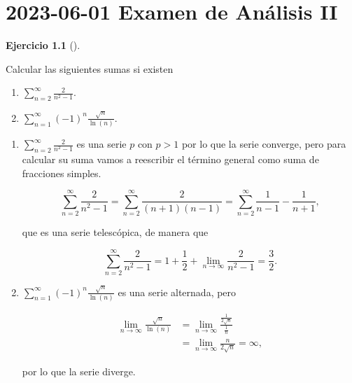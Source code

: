 \documentclass[
  spanish,
  a4paper,
]{scrreport}
\theoremstyle{definition}
\newtheorem{exercise}{Ejercicio}[chapter]
\theoremstyle{remark}
\begin{document}

\chapter{\texorpdfstring{2023-06-01 Examen de Análisis
II}{2023-06-01  Examen de Análisis II}}\label{examen-de-anuxe1lisis-ii-1}

\begin{exercise}[]\protect\hypertarget{exr-1}{}\label{exr-1}

Calcular las siguientes sumas si existen

\begin{enumerate}
\def\labelenumi{\alph{enumi}.}
\item
  \(\displaystyle \sum_{n=2}^\infty \frac{2}{n^2-1}\).
\item
  \(\displaystyle\sum_{n=1}^\infty (-1)^n \frac{\sqrt{n}}{\ln(n)}\).
\end{enumerate}

\end{exercise}

\begin{tcolorbox}[enhanced jigsaw, arc=.35mm, bottomrule=.15mm, bottomtitle=1mm, breakable, colback=white, colbacktitle=quarto-callout-tip-color!10!white, colframe=quarto-callout-tip-color-frame, coltitle=black, left=2mm, leftrule=.75mm, opacityback=0, opacitybacktitle=0.6, rightrule=.15mm, title=\textcolor{quarto-callout-tip-color}{\faLightbulb}\hspace{0.5em}{Solución}, titlerule=0mm, toprule=.15mm, toptitle=1mm]

\begin{enumerate}
\def\labelenumi{\alph{enumi}.}
\item
  \(\displaystyle \sum_{n=2}^\infty \frac{2}{n^2-1}\) es una serie \(p\)
  con \(p>1\) por lo que la serie converge, pero para calcular su suma
  vamos a reescribir el término general como suma de fracciones simples.

  \[
  \sum_{n=2}^\infty \frac{2}{n^2-1} 
  = \sum_{n=2}^\infty \frac{2}{(n+1)(n-1)} 
  = \sum_{n=2}^\infty \frac{1}{n-1}-\frac{1}{n+1},
  \]

  que es una serie telescópica, de manera que

  \[
  \sum_{n=2}^\infty \frac{2}{n^2-1} = 1 +\frac{1}{2}+ \lim_{n\to\infty}\frac{2}{n^2-1} = \frac{3}{2}.
  \]
\item
  \(\displaystyle\sum_{n=1}^\infty (-1)^n \frac{\sqrt{n}}{\ln(n)}\) es
  una serie alternada, pero

  \begin{align*}
   \lim_{n\to\infty} \frac{\sqrt{n}}{\ln(n)} 
   &= \lim_{n\to\infty} \frac{\frac{1}{2\sqrt{n}}}{\frac{1}{n}} \tag{L'Hôpital}\\
   &= \lim_{n\to\infty} \frac{n}{2\sqrt{n}} 
   = \infty,
   \end{align*}

  por lo que la serie diverge.
\end{enumerate}

\end{tcolorbox}
\end{document}
